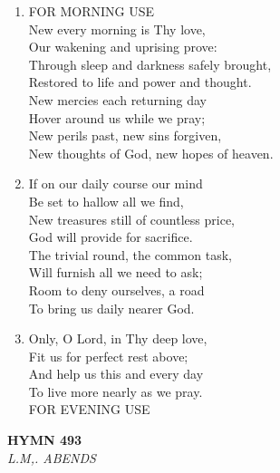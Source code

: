 \documentclass[11pt,a4paper]{article}
\begin{document}
\begin{enumerate}
    \item FOR MORNING USE \\
        New every morning is Thy love, \\
        Our wakening and uprising prove: \\
        Through sleep and darkness safely brought, \\
        Restored to life and power and thought. \\
        New mercies each returning day \\
        Hover around us while we pray; \\
        New perils past, new sins forgiven, \\
        New thoughts of God, new hopes of heaven.

    \item If on our daily course our mind \\
        Be set to hallow all we find, \\
        New treasures still of countless price, \\
        God will provide for sacrifice. \\
        The trivial round, the common task, \\
        Will furnish all we need to ask; \\
        Room to deny ourselves, a road \\
        To bring us daily nearer God.

    \item Only, O Lord, in Thy deep love, \\
        Fit us for perfect rest above; \\
        And help us this and every day \\
        To live more nearly as we pray. \\
        FOR EVENING USE

\end{enumerate}

\newpage
\begin{center}
    {\Large \textbf{HYMN 493}}
    \\
    \textit{L.M,. ABENDS}
\end{center}
\vspace{1em}
\end{document}
